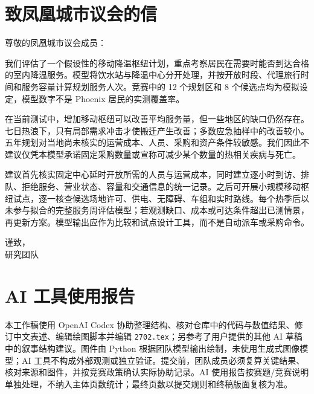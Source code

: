 \documentclass[12pt]{article}
\begin{document}
\clearpage
\section*{致凤凰城市议会的信}

尊敬的凤凰城市议会成员：

我们评估了一个假设性的移动降温枢纽计划，重点考察居民在需要时能否到达合格的室内降温服务。模型将饮水站与降温中心分开处理，并按开放时段、代理旅行时间和服务容量计算规划服务人次。竞赛中的 12 个规划区和 8 个候选点均为模拟设定，模型数字不是 Phoenix 居民的实测覆盖率。

在当前测试中，增加移动枢纽可以改善平均服务量，但一些地区的缺口仍然存在。七日热浪下，只有局部需求冲击才使搬迁产生改善；多数应急抽样中的改善较小。五年规划对当地尚未核实的运营成本、人员、采购和资产条件较敏感。我们因此不建议仅凭本模型承诺固定采购数量或宣称可减少某个数量的热相关疾病与死亡。

建议首先核实固定中心延时开放所需的人员与运营成本，同时建立逐小时到访、排队、拒绝服务、营业状态、容量和交通信息的统一记录。之后可开展小规模移动枢纽试点，逐一核查候选场地许可、供电、无障碍、车组和实时路线。每个热季后以未参与拟合的完整服务周评估模型；若观测缺口、成本或可达条件超出已测情景，再更新方案。模型输出应作为比较和试点设计工具，而不是自动派车或采购命令。

谨致，\\
研究团队

\label{solutionlastpage}
\clearpage
{}
\section*{AI 工具使用报告}

本工作稿使用 OpenAI Codex 协助整理结构、核对仓库中的代码与数值结果、修订中文表述、编辑绘图脚本并编辑 \texttt{2702.tex}；另参考了用户提供的其他 AI 草稿中的叙事结构建议。图件由 Python 根据团队模型输出绘制，未使用生成式图像模型；AI 工具不构成外部观测或独立验证。提交前，团队成员必须复算关键结果、核对来源和图件，并按竞赛政策确认实际协助记录。AI 使用报告按赛题/竞赛说明单独处理，不纳入主体页数统计；最终页数以提交规则和终稿版面复核为准\citep{comapAI}。
\end{document}
